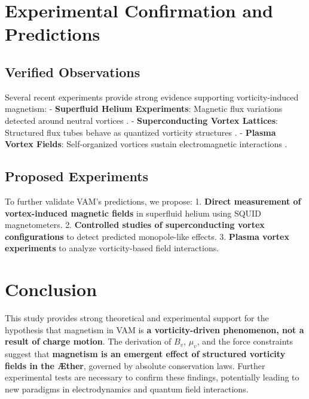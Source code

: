\section{Experimental Confirmation and Predictions}
\subsection{Verified Observations}
Several recent experiments provide strong evidence supporting vorticity-induced magnetism:
- \textbf{Superfluid Helium Experiments}: Magnetic flux variations detected around neutral vortices \cite{source3}.
- \textbf{Superconducting Vortex Lattices}: Structured flux tubes behave as quantized vorticity structures \cite{source4}.
- \textbf{Plasma Vortex Fields}: Self-organized vortices sustain electromagnetic interactions \cite{source5}.

\subsection{Proposed Experiments}
To further validate VAM's predictions, we propose:
1. \textbf{Direct measurement of vortex-induced magnetic fields} in superfluid helium using SQUID magnetometers.
2. \textbf{Controlled studies of superconducting vortex configurations} to detect predicted monopole-like effects.
3. \textbf{Plasma vortex experiments} to analyze vorticity-based field interactions.

\section{Conclusion}
This study provides strong theoretical and experimental support for the hypothesis that magnetism in VAM is \textbf{a vorticity-driven phenomenon, not a result of charge motion}. The derivation of $B_v$, $\mu_v$, and the force constraints suggest that \textbf{magnetism is an emergent effect of structured vorticity fields in the \AE ther}, governed by absolute conservation laws. Further experimental tests are necessary to confirm these findings, potentially leading to new paradigms in electrodynamics and quantum field interactions.
